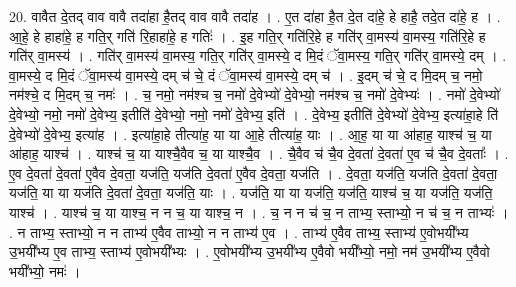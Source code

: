 \documentclass[17pt]{extarticle}
\begin{document}
20. वावैत दे॒तद् वाव वावै तदा॑हा है॒तद् वाव वावै तदा॑ह । . ए॒त दा॑हा है॒त दे॒त दा॑हे॒ हे हाहै॒ तदे॒त दा॑हे॒ ह । . आ॒हे॒ हे हाहा॑हे॒ ह गति॒र् गति॑ रि॒हाहा॑हे॒ ह गतिः॑ । . इ॒ह गति॒र् गति॑रि॒हे ह गति॑र् वा॒मस्य॑ वा॒मस्य॒ गति॑रि॒हे ह गति॑र् वा॒मस्य॑ । . गति॑र् वा॒मस्य॑ वा॒मस्य॒ गति॒र् गति॑र् वा॒मस्ये॒ द मि॒दं ॅवा॒मस्य॒ गति॒र् गति॑र् वा॒मस्ये॒ दम् । . वा॒मस्ये॒ द मि॒दं ॅवा॒मस्य॑ वा॒मस्ये॒ दम् च॑ चे॒ दं ॅवा॒मस्य॑ वा॒मस्ये॒ दम् च॑ । . इ॒दम् च॑ चे॒ द मि॒दम् च॒ नमो॒ नम॑श्चे॒ द मि॒दम् च॒ नमः॑ । . च॒ नमो॒ नम॑श्च च॒ नमो॑ दे॒वेभ्यो॑ दे॒वेभ्यो॒ नम॑श्च च॒ नमो॑ दे॒वेभ्यः॑ । . नमो॑ दे॒वेभ्यो॑ दे॒वेभ्यो॒ नमो॒ नमो॑ दे॒वेभ्य॒ इतीति॑ दे॒वेभ्यो॒ नमो॒ नमो॑ दे॒वेभ्य॒ इति॑ । . दे॒वेभ्य॒ इतीति॑ दे॒वेभ्यो॑ दे॒वेभ्य॒ इत्या॑हा॒हे ति॑ दे॒वेभ्यो॑ दे॒वेभ्य॒ इत्या॑ह । . इत्या॑हा॒हे तीत्या॑ह॒ या या आ॒हे तीत्या॑ह॒ याः । . आ॒ह॒ या या आ॑हाह॒ याश्च॑ च॒ या आ॑हाह॒ याश्च॑ । . याश्च॑ च॒ या याश्चै॒वैव च॒ या याश्चै॒व । . चै॒वैव च॑ चै॒व दे॒वता॑ दे॒वता॑ ए॒व च॑ चै॒व दे॒वताः᳚ । . ए॒व दे॒वता॑ दे॒वता॑ ए॒वैव दे॒वता॒ यज॑ति॒ यज॑ति दे॒वता॑ ए॒वैव दे॒वता॒ यज॑ति । . दे॒वता॒ यज॑ति॒ यज॑ति दे॒वता॑ दे॒वता॒ यज॑ति॒ या या यज॑ति दे॒वता॑ दे॒वता॒ यज॑ति॒ याः । . यज॑ति॒ या या यज॑ति॒ यज॑ति॒ याश्च॑ च॒ या यज॑ति॒ यज॑ति॒ याश्च॑ । . याश्च॑ च॒ या याश्च॒ न न च॒ या याश्च॒ न । . च॒ न न च॑ च॒ न ताभ्य॒ स्ताभ्यो॒ न च॑ च॒ न ताभ्यः॑ । . न ताभ्य॒ स्ताभ्यो॒ न न ताभ्य॑ ए॒वैव ताभ्यो॒ न न ताभ्य॑ ए॒व । . ताभ्य॑ ए॒वैव ताभ्य॒ स्ताभ्य॑ ए॒वोभयी᳚भ्य उ॒भयी᳚भ्य ए॒व ताभ्य॒ स्ताभ्य॑ ए॒वोभयी᳚भ्यः । . ए॒वोभयी᳚भ्य उ॒भयी᳚भ्य ए॒वैवो भयी᳚भ्यो॒ नमो॒ नम॑ उ॒भयी᳚भ्य ए॒वैवो भयी᳚भ्यो॒ नमः॑ । \newline
\end{document}
